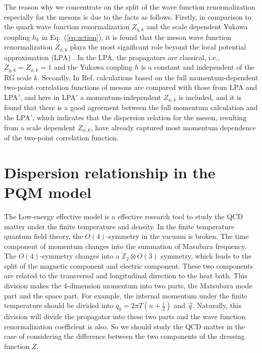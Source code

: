 \documentclass[%
reprint,
superscriptaddress,
showpacs,preprintnumbers,
 amsmath,amssymb,
 aps,
prd,
]{revtex4-1}
\def\Eq#1{Eq.~(\ref{#1})}
\begin{document}
The reason why we concentrate on the split of the wave function renormalization especially for the mesons is due to the facts as follows. Firstly, in comparison to the quark wave function renormalization $Z_{q,k}$ and the scale dependent Yukawa coupling $h_k$ in \Eq{eq:action}, it is found that the meson wave function renormalization $Z_{\phi,k}$ plays the most significant role beyond the local potential approximation (LPA) \cite{Pawlowski:2014zaa,Fu:2015naa}. In the LPA, the propagators are classical, i.e., $Z_{q,k}=Z_{\phi,k}=1$ and the Yukawa coupling $h$ is a constant and independent of the RG scale $k$. Secondly, In Ref. \cite{Helmboldt:2014iya} calculations based on the full momentum-dependent two-point correlation functions of mesons are compared with those from LPA and LPA$'$, and here in LPA$'$ a momentum-independent $Z_{\phi,k}$ is included, and it is found that there is a good agreement between the full momentum calculation and the LPA$'$, which indicates that the dispersion relation for the meson, resulting from a scale dependent $Z_{\phi,k}$, have already captured most momentum dependence of the two-point correlation function.


















\section{Dispersion relationship in the PQM model}
\label{sec:}

The Low-energy effective model is a effective research tool to study the QCD matter under the finite temperature and density. In the 
finite temperature quantum field theory, the $O(4)$-symmetry in the vacuum is broken. The time component of momentum changes into the 
summation of Masubara frequency. The $O(4)$-symmetry changes into a 
$\mathbb{Z}_2\otimes O(3)$ symmetry, which leads to the split of the magnetic component and electric component. These two 
components are related to the transversal and longitudinal direction to the heat bath. This division makes the 4-dimension momentum
into two parts, the Matsubara mode part and the space part. For example, the internal momentum under the finite temperature should 
be divided into $q_0=2\pi T(n+\frac{1}{2})$ and $\vec{q}$. Naturally, this division will divide the propagator into these two parts and 
the wave function renormalization coefficient is also. So we should study the QCD matter in the case of considering the difference 
between the two components of the dressing function $Z$. \par
\end{document}
